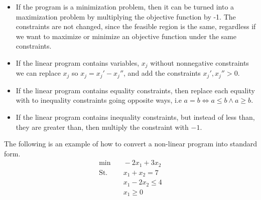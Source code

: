 \documentclass[10pt]{article}
\begin{document}
\begin{itemize}
  \item If the program is a minimization problem, then it can be turned into a maximization problem by multiplying the objective function by -1. The constraints are not changed, since the feasible region is the same, regardless if we want to maximize or minimize an objective function under the same constraints.                                                                         
  \item If the linear program contains variables, $x_j$ without nonnegative constraints we can replace $x_j$ so $x_j = x_j'-x_j''$, and add the constraints $x_j', x_j''>0$.
  \item If the linear program contains equality constraints, then replace each equality with to inequality constraints going opposite ways, i.e $a = b \Leftrightarrow a \leq b \wedge a \geq b$. 
  \item If the linear program contains inequality constraints, but instead of less than, they are greater than, then multiply the constraint with $-1$.
\end{itemize}

The following is an example of how to convert a non-linear program into standard form. 
\begin{align*}
 \min &\quad -2x_1 + 3x_2  \\ 
 \text{St.} &\quad  x_1 + x_2  = 7 \\
            &\quad  x_1 - 2x_2 \leq 4 \\
            &\quad  x_1        \geq 0  
\end{align*}
\end{document}
